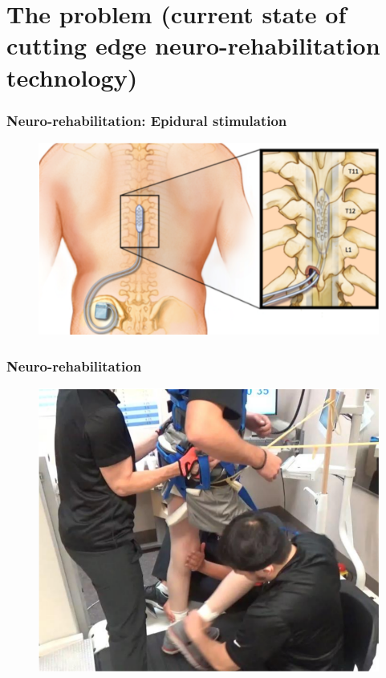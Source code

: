 \documentclass[12pt, aspectratio=169]{beamer}
\begin{document}



\section{The problem (current state of cutting edge neuro-rehabilitation technology)}
\begin{frame}
  \frametitle{Neuro-rehabilitation: Epidural stimulation}
  \begin{figure}
    \includegraphics[width=0.6\linewidth]{epidural_stimulation_spinal_cord}
  \end{figure}
\end{frame}

\begin{frame}
  \frametitle{Neuro-rehabilitation}
  \begin{figure}
    \includegraphics[width=0.5\linewidth]{neurorehabilitation}
  \end{figure}
\end{frame}

\end{document}
